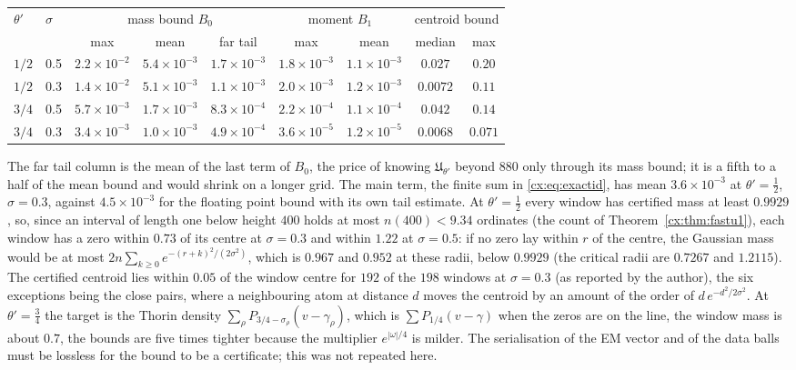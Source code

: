 \begin{center}
\small
\setlength{\tabcolsep}{2.5pt}\footnotesize
\begin{tabular}{llccccccc}
\toprule
$\theta'$ & $\sigma$ & \multicolumn{3}{c}{mass bound $B_0$} & \multicolumn{2}{c}{moment $B_1$} & \multicolumn{2}{c}{centroid bound}\\
& & max & mean & far tail & max & mean & median & max\\
\midrule
$1/2$ & 0.5 & $2.2\times10^{-2}$ & $5.4\times10^{-3}$ & $1.7\times10^{-3}$ & $1.8\times10^{-3}$ & $1.1\times10^{-3}$ & $0.027$ & $0.20$\\
$1/2$ & 0.3 & $1.4\times10^{-2}$ & $5.1\times10^{-3}$ & $1.1\times10^{-3}$ & $2.0\times10^{-3}$ & $1.2\times10^{-3}$ & $0.0072$ & $0.11$\\
$3/4$ & 0.5 & $5.7\times10^{-3}$ & $1.7\times10^{-3}$ & $8.3\times10^{-4}$ & $2.2\times10^{-4}$ & $1.1\times10^{-4}$ & $0.042$ & $0.14$\\
$3/4$ & 0.3 & $3.4\times10^{-3}$ & $1.0\times10^{-3}$ & $4.9\times10^{-4}$ & $3.6\times10^{-5}$ & $1.2\times10^{-5}$ & $0.0068$ & $0.071$\\
\bottomrule
\end{tabular}
\end{center}

\noindent The far tail column is the mean of the last term of $B_0$, the price of knowing $\mathfrak U_{\theta'}$ beyond $880$ only through its mass bound; it is a fifth to a half of the mean bound and would shrink on a longer grid. The main term, the finite sum in \eqref{cx:eq:exactid}, has mean $3.6\times10^{-3}$ at $\theta'=\tfrac12$, $\sigma=0.3$, against $4.5\times10^{-3}$ for the floating point bound with its own tail estimate. At $\theta'=\tfrac12$ every window has certified mass at least $0.9929$, so, since an interval of length one below height $400$ holds at most $n(400)<9.34$ ordinates (the count of Theorem~\ref{cx:thm:fastu1}), each window has a zero within $0.73$ of its centre at $\sigma=0.3$ and within $1.22$ at $\sigma=0.5$: if no zero lay within $r$ of the centre, the Gaussian mass would be at most $2n\sum_{k\ge0}e^{-(r+k)^2/(2\sigma^2)}$, which is $0.967$ and $0.952$ at these radii, below $0.9929$ (the critical radii are $0.7267$ and $1.2115$). The certified centroid lies within $0.05$ of the window centre for $192$ of the $198$ windows at $\sigma=0.3$ (as reported by the author), the six exceptions being the close pairs, where a neighbouring atom at distance $d$ moves the centroid by an amount of the order of $d\,e^{-d^2/2\sigma^2}$. At $\theta'=\tfrac34$ the target is the Thorin density $\sum_\rho P_{3/4-\sigma_\rho}(v-\gamma_\rho)$, which is $\sum P_{1/4}(v-\gamma)$ when the zeros are on the line, the window mass is about $0.7$, the bounds are five times tighter because the multiplier $e^{|\omega|/4}$ is milder. The serialisation of the EM vector and of the data balls must be lossless for the bound to be a certificate; this was not repeated here.


